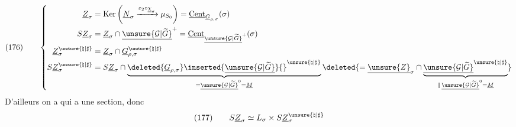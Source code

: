 \[
(176)\qquad
\left\{
\begin{aligned}
\underline Z_\sigma
&=\operatorname{Ker}\left(
\underline N_\sigma\xrightarrow{\varepsilon_2\circ\underline\chi_\sigma}\mu_{S_0}
\right)
=\underline{\operatorname{Cent}}_{\underline G_{\rho,\sigma}}(\sigma)\\
S\underline Z_\sigma
&=\underline Z_\sigma\cap\underline{\unsure{\mathcal G|\widetilde G}}^{+}
=\underline{\operatorname{Cent}}_{\underline{\unsure{\mathcal G|\widetilde G}}^{+}}(\sigma)\\
\underline Z_\sigma^{\unsure{\natural|\sharp}}
&=\underline Z_\sigma\cap\underline G_{\rho,\sigma}^{\unsure{\natural|\sharp}}\\
S\underline Z_\sigma^{\unsure{\natural|\sharp}}
&=S\underline Z_\sigma\cap
\underbrace{
\deleted{\underline G_{\rho,\sigma}}\inserted{\underline{\unsure{\mathcal G|\widetilde G}}}{}^{\unsure{\natural|\sharp}}
}_{=\underline{\unsure{\mathcal G|\widetilde G}}^0=\underline M}
\deleted{
=\underline{\unsure{Z}}_\sigma\cap
\underbrace{\underline{\unsure{\mathcal G|\widetilde G}}^{\unsure{\natural|\sharp}}}
_{\parallel\,\underline{\unsure{\mathcal G|\widetilde G}}^0=\underline M}
}
\end{aligned}
\right.
\]
D'ailleurs on a
qui a une section, donc
\[
(177)\qquad
S\underline Z_\sigma\simeq L_\sigma\times S\underline Z_\sigma^{\unsure{\natural|\sharp}}
\]




